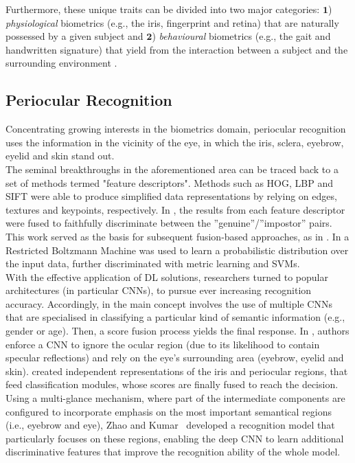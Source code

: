 Furthermore, these unique traits can be divided into two major categories: $\mathbf{1}$) \textit{physiological} biometrics (e.g., the iris, fingerprint and retina) that are naturally possessed by a given subject and $\mathbf{2}$) \textit{behavioural} biometrics (e.g., the gait and handwritten signature) that yield from the interaction between a subject and the surrounding environment  \cite{biometric_recognition_dl_survey}.

\subsection{Periocular Recognition}
\label{subsec:chap2_periocular_recognition}

Concentrating growing interests in the biometrics domain, periocular recognition uses the information in the vicinity of the eye, in which the iris, sclera, eyebrow, eyelid and skin stand out. \\

The seminal breakthroughs in the aforementioned area can be traced back to a set of methods termed "feature descriptors". Methods such as \ac{HOG}, \ac{LBP} and \ac{SIFT} were able to produce simplified data representations by relying on edges, textures and keypoints, respectively. In \cite{feasibility_study}, the results from each feature descriptor were fused to faithfully discriminate between the ''genuine''/''impostor'' pairs. This work served as the basis for subsequent fusion-based approaches, as in \cite{information_fusion_approach}.  In \cite{rbm_feature_learning} a Restricted Boltzmann Machine was used to learn a probabilistic distribution over the input data, further discriminated with metric learning and \ac{SVM}s.\\

With the effective application of \ac{DL} solutions, researchers turned to popular architectures (in particular \ac{CNN}s), to pursue ever increasing recognition accuracy. Accordingly, in \cite{accurate_periocular_recognition} the main concept involves the use of multiple \ac{CNN}s that are specialised in classifying a particular kind of semantic information (e.g., gender or age). Then, a score fusion process yields the final response. In \cite{deep_prwis},  authors enforce a \ac{CNN} to ignore the ocular region (due to its likelihood to contain specular reflections) and rely on the eye's surrounding area (eyebrow, eyelid and skin). \cite{person_identification} created independent representations of the iris and periocular regions, that feed classification modules, whose scores are finally fused to reach the decision. Using a multi-glance mechanism, where part of the intermediate components are configured to incorporate emphasis on the most important semantical regions (i.e., eyebrow and eye), Zhao and Kumar~\cite{zhao_kumar_novel} developed a recognition model that particularly focuses on these regions, enabling the deep \ac{CNN} to learn additional discriminative features that improve the recognition ability of the whole model. 

